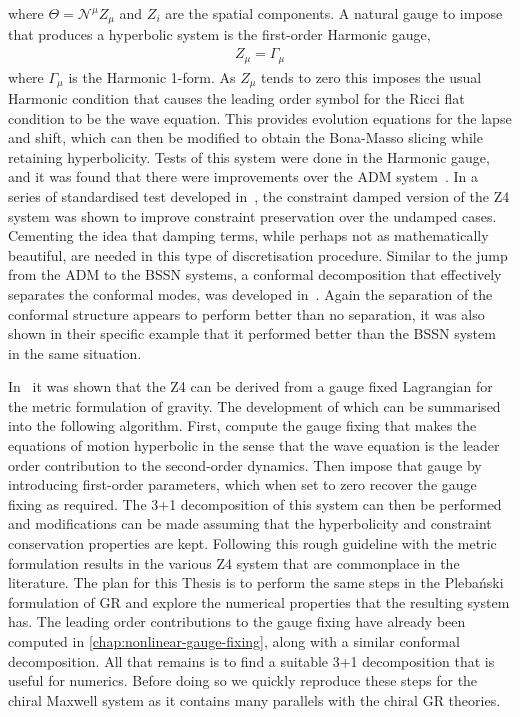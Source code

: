 \documentclass[10pt]{report}
\newcommand{\pleb}[0]{Pleba\'nski}
\theoremstyle{definition}
\begin{document}
where $\Theta = \mathcal{N}^\mu Z_\mu$ and $Z_i$ are the spatial components. A natural gauge to impose that produces a hyperbolic system is the first-order Harmonic gauge,
\begin{align}
    Z_\mu = \Gamma_\mu
\end{align}
where $\Gamma_\mu$ is the Harmonic 1-form. As $Z_\mu$ tends to zero this imposes the usual Harmonic condition that causes the leading order symbol for the Ricci flat condition to be the wave equation. This provides evolution equations for the lapse and shift, which can then be modified to obtain the Bona-Masso slicing while retaining hyperbolicity. Tests of this system were done in the Harmonic gauge, and it was found that there were improvements over the ADM system~\cite{A_symmetry_brea_Bona_2003}. In a series of standardised test developed in~\cite{Apples_with_App_Daveri_2018}, the constraint damped version of the Z4 system was shown to improve constraint preservation over the undamped cases. Cementing the idea that damping terms, while perhaps not as mathematically beautiful, are needed in this type of discretisation procedure.  Similar to the jump from the ADM to the BSSN systems, a conformal decomposition that effectively separates the conformal modes, was developed in~\cite{Conformal_and_c_Alic_2012}. Again the separation of the conformal structure appears to perform better than no separation, it was also shown in their specific example that it performed better than the BSSN system in the same situation.

In~\cite{ActionPrinciplBona2011} it was shown that the Z4 can be derived from a gauge fixed Lagrangian for the metric formulation of gravity. The development of which can be summarised into the following algorithm. First, compute the gauge fixing that makes the equations of motion hyperbolic in the sense that the wave equation is the leader order contribution to the second-order dynamics. Then impose that gauge by introducing first-order parameters, which when set to zero recover the gauge fixing as required. The 3+1 decomposition of this system can then be performed and modifications can be made assuming that the hyperbolicity and constraint conservation properties are kept. Following this rough guideline with the metric formulation results in the various Z4 system that are commonplace in the literature. The plan for this Thesis is to perform the same steps in the \pleb{} formulation of GR and explore the numerical properties that the resulting system has. The leading order contributions to the gauge fixing have already been computed in \cref{chap:nonlinear-gauge-fixing}, along with a similar conformal decomposition. All that remains is to find a suitable 3+1 decomposition that is useful for numerics. Before doing so we quickly reproduce these steps for the chiral Maxwell system as it contains many parallels with the chiral GR theories.
\end{document}
